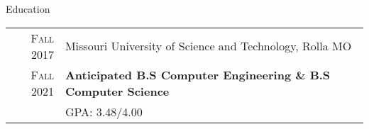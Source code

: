 \documentclass{resume}
\begin{document}



\begin{rSection}{Education}
    \small
    {
        \begin{tabular}{r|p{15cm}}
            \textsc{Fall} 2017 & Missouri University of Science and Technology, Rolla MO  \\ 
            \textsc{Fall} 2021 & \textbf{Anticipated B.S Computer Engineering \& B.S Computer Science} \\
                              & GPA: 3.48/4.00 \\
        \end{tabular}
    }
\end{rSection}
\end{document}
